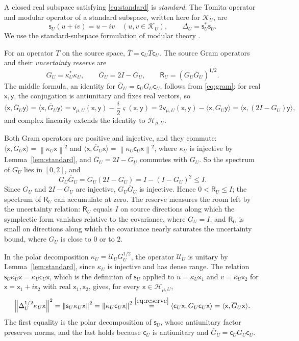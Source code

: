 \documentclass[11pt]{amsart}
\numberwithin{equation}{section}
\theoremstyle{definition}
\newcommand{\Hh}{\mathcal H}
\newcommand{\vv}{\mathsf v}
\newcommand{\Res}{\mathsf R}
\newcommand{\sx}{\mathsf x}
\newcommand{\sy}{\mathsf y}
\newcommand{\norm}[1]{\left\|#1\right\|}
\newcommand{\ip}[2]{\langle #1,#2\rangle}
\begin{document}
A closed real subspace satisfying \eqref{eq:standard} is
\emph{standard}. The Tomita operator and modular operator of a standard
subspace, written here for \(\mathcal K_U\), are
\[
 \mathsf s_U(u+iv)=u-iv\quad(u,v\in\mathcal K_U),\qquad
 \Delta_U=\mathsf s_U^*\mathsf s_U.
\]
We use the standard-subspace formulation of modular theory
\cite{EO73,RvD77}.

For an operator \(T\) on the source space,
\(\overline T=\mathsf c_UT\mathsf c_U\). The source Gram operators and
their \emph{uncertainty reserve} are
\begin{equation}
 G_U=\kappa_U^*\kappa_U,\qquad
 \overline G_U=2I-G_U,\qquad
 \Res_U=(G_U\overline G_U)^{1/2}.
 \label{eq:reserve}
\end{equation}
The middle formula, an identity for
\(\overline G_U=\mathsf c_UG_U\mathsf c_U\), follows from \eqref{eq:gram}: for real
\(\sx,\sy\), the conjugation is antiunitary and fixes real vectors, so
\[
 \ip{\sx}{\overline G_U\sy}
 =\overline{\ip{\sx}{G_U\sy}}
 =\vv_{\mu,U}(\sx,\sy)-\frac i2\varsigma(\sx,\sy)
 =2\vv_{\mu,U}(\sx,\sy)-\ip{\sx}{G_U\sy}
 =\ip{\sx}{(2I-G_U)\sy},
\]
and complex linearity extends the identity to \(\Hh_{\mu,U}\).

Both Gram operators are positive and injective, and they commute:
\(\ip{\sx}{G_U\sx}=\norm{\kappa_U\sx}^2\) and
\(\ip{\sx}{\overline G_U\sx}=\norm{\kappa_U\mathsf c_U\sx}^2\), where
\(\kappa_U\) is injective by Lemma~\ref{lem:standard}, and
\(\overline G_U=2I-G_U\) commutes with \(G_U\). So the spectrum of
\(G_U\) lies in \([0,2]\), and
\[
 G_U\overline G_U=G_U(2I-G_U)=I-(I-G_U)^2\le I.
\]
Since \(G_U\) and
\(2I-G_U\) are injective, \(G_U\overline G_U\) is injective. Hence
\(0<\Res_U\le I\); the spectrum of \(\Res_U\) can accumulate at
zero. The reserve
measures the room left by the uncertainty relation: \(\Res_U\) equals
\(I\) on source directions along which the symplectic form vanishes
relative to the covariance, where \(G_U=I\), and \(\Res_U\) is small
on directions along which the covariance nearly saturates the
uncertainty bound, where \(G_U\) is close to \(0\) or to \(2\).

In the polar decomposition
\(\kappa_U=\mathcal U_UG_U^{1/2}\), the operator \(\mathcal U_U\)
is unitary by Lemma~\ref{lem:standard}, since \(\kappa_U\) is injective
and has dense range. The relation
\(\mathsf s_U\kappa_U\sx=\kappa_U\mathsf c_U\sx\), which is the
definition of \(\mathsf s_U\) applied to \(u=\kappa_U\sx_1\) and
\(v=\kappa_U\sx_2\) for \(\sx=\sx_1+i\sx_2\) with real \(\sx_1,\sx_2\),
gives, for every \(\sx\in\Hh_{\mu,U}\),
\[
 \norm{\Delta_U^{1/2}\kappa_U\sx}^2
 =\norm{\mathsf s_U\kappa_U\sx}^2
 =\norm{\kappa_U\mathsf c_U\sx}^2
 \overset{\eqref{eq:reserve}}{=}\ip{\mathsf c_U\sx}{G_U\mathsf c_U\sx}
 =\ip{\sx}{\overline G_U\sx}.
\]
The first equality is the polar decomposition of \(\mathsf s_U\), whose
antiunitary factor preserves norms, and the last holds because
\(\mathsf c_U\) is antiunitary and
\(\overline G_U=\mathsf c_UG_U\mathsf c_U\).
\end{document}
